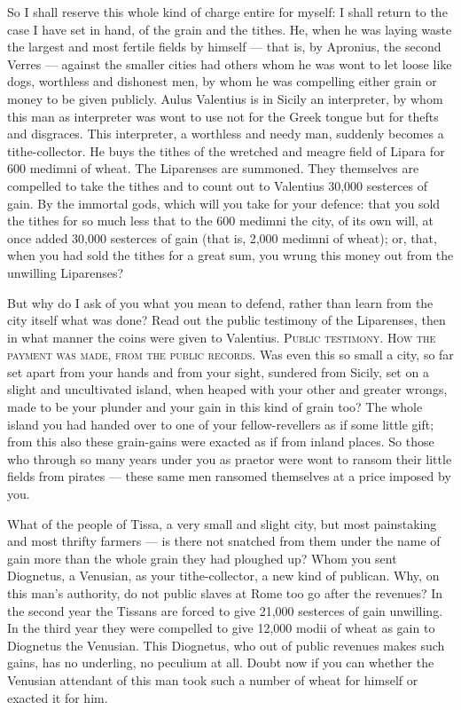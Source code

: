  So I shall reserve this whole kind of charge entire for myself: I shall return to the case I have set in hand, of the grain and the tithes. He, when he was laying waste the largest and most fertile fields by himself --- that is, by Apronius, the second Verres --- against the smaller cities had others whom he was wont to let loose like dogs, worthless and dishonest men, by whom he was compelling either grain or money to be given publicly. Aulus Valentius is in Sicily an interpreter, by whom this man as interpreter was wont to use not for the Greek tongue but for thefts and disgraces. This interpreter, a worthless and needy man, suddenly becomes a tithe-collector. He buys the tithes of the wretched and meagre field of Lipara for 600 medimni of wheat. The Liparenses are summoned. They themselves are compelled to take the tithes and to count out to Valentius 30,000 sesterces of gain. By the immortal gods, which will you take for your defence: that you sold the tithes for so much less that to the 600 medimni the city, of its own will, at once added 30,000 sesterces of gain (that is, 2,000 medimni of wheat); or, that, when you had sold the tithes for a great sum, you wrung this money out from the unwilling Liparenses?

 But why do I ask of you what you mean to defend, rather than learn from the city itself what was done? Read out the public testimony of the Liparenses, then in what manner the coins were given to Valentius. \textsc{Public testimony. How the payment was made, from the public records}. Was even this so small a city, so far set apart from your hands and from your sight, sundered from Sicily, set on a slight and uncultivated island, when heaped with your other and greater wrongs, made to be your plunder and your gain in this kind of grain too? The whole island you had handed over to one of your fellow-revellers as if some little gift; from this also these grain-gains were exacted as if from inland places. So those who through so many years under you as praetor were wont to ransom their little fields from pirates --- these same men ransomed themselves at a price imposed by you.

 What of the people of Tissa, a very small and slight city, but most painstaking and most thrifty farmers --- is there not snatched from them under the name of gain more than the whole grain they had ploughed up? Whom you sent Diognetus, a Venusian, as your tithe-collector, a new kind of publican. Why, on this man's authority, do not public slaves at Rome too go after the revenues? In the second year the Tissans are forced to give 21,000 sesterces of gain unwilling. In the third year they were compelled to give 12,000 modii of wheat as gain to Diognetus the Venusian. This Diognetus, who out of public revenues makes such gains, has no underling, no peculium at all. Doubt now if you can whether the Venusian attendant of this man took such a number of wheat for himself or exacted it for him.

